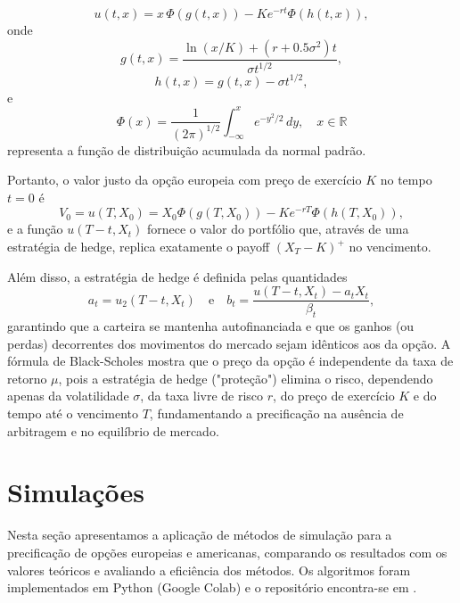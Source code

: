 \documentclass[12pt,openright,oneside,a4paper]{abntex2}
\numberwithin{equation}{section}
\begin{document}
\begin{equation}
    u(t, x) = x \, \Phi(g(t, x)) - K e^{-rt} \Phi(h(t, x)),
\end{equation}
onde
\begin{equation}
    g(t, x) = \frac{\ln(x/K) + (r + 0.5 \sigma^2) t}{\sigma t^{1/2}},
\end{equation}
\begin{equation}
    h(t, x) = g(t, x) - \sigma t^{1/2},
\end{equation}
e
\begin{equation}
    \Phi(x) = \frac{1}{(2\pi)^{1/2}} \int_{-\infty}^{x} e^{-y^2/2} \, dy, 
    \quad x \in \mathbb{R}
\end{equation}
representa a função de distribuição acumulada da normal padrão.

Portanto, o valor justo da opção europeia com preço de exercício $K$ no tempo $t = 0$ é
\begin{equation}
    V_0 = u(T, X_0) = X_0 \Phi(g(T, X_0)) - K e^{-rT} \Phi(h(T, X_0)), 
\end{equation}
e a função $u(T-t,X_t)$ fornece o valor do portfólio que, através de uma estratégia de hedge, replica exatamente o payoff $(X_T-K)^+$ no vencimento.

Além disso, a estratégia de hedge é definida pelas quantidades
\begin{equation}
    a_t = u_2(T - t, X_t) \quad \text{e} \quad 
    b_t = \frac{u(T - t, X_t) - a_t X_t}{\beta_t}, 
\end{equation}
garantindo que a carteira se mantenha autofinanciada e que os ganhos (ou perdas) decorrentes dos movimentos do mercado sejam idênticos aos da opção. A fórmula de Black-Scholes mostra que o preço da opção é independente da taxa de retorno $\mu$, pois a estratégia de hedge ("proteção") elimina o risco, dependendo apenas da volatilidade \(\sigma\), da taxa livre de risco \(r\), do preço de exercício \(K\) e do tempo até o vencimento \(T\), fundamentando a precificação na ausência de arbitragem e no equilíbrio de mercado.



\section{Simulações}

Nesta seção apresentamos a aplicação de métodos de simulação para a precificação de opções europeias e americanas, comparando os resultados com os valores teóricos e avaliando a eficiência dos métodos. Os algoritmos foram implementados em Python (Google Colab) e o repositório encontra-se em \textcite{simulacoes2025}.
\end{document}
